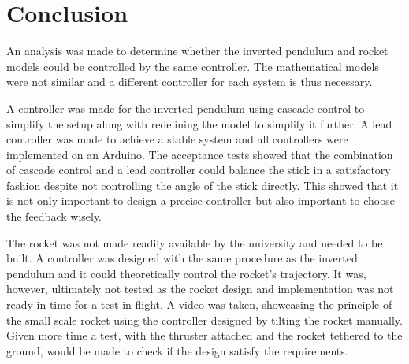 \chapter{Conclusion}
An analysis was made to determine whether the inverted pendulum and rocket models could be controlled by the same controller. The mathematical models were not similar and a different controller for each system is thus necessary. 

A controller was made for the inverted pendulum using cascade control to simplify the setup along with redefining the model to simplify it further. A lead controller was made to achieve a stable system and all controllers were implemented on an Arduino. The acceptance tests showed that the combination of cascade control and a lead controller could balance the stick in a satisfactory fashion despite not controlling the angle of the stick directly. This showed that it is not only important to design a precise controller but also important to choose the feedback wisely.

The rocket was not made readily available by the university and needed to be built. A controller was designed with the same procedure as the inverted pendulum and it could theoretically control the rocket's trajectory. It was, however, ultimately not tested as the rocket design and implementation was not ready in time for a test in flight. A video was taken, showcasing the principle of the small scale rocket using the controller designed by tilting the rocket manually. Given more time a test, with the thruster attached and the rocket tethered to the ground, would be made to check if the design satisfy the requirements.